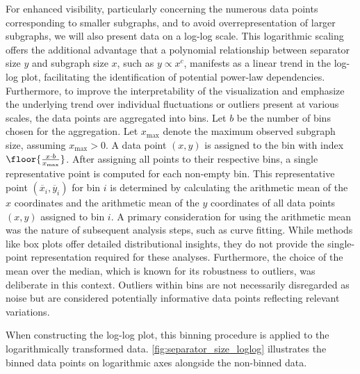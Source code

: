 For enhanced visibility, particularly concerning the numerous data points corresponding to smaller subgraphs, and to avoid overrepresentation of larger subgraphs, we will also present data on a log-log scale.
This logarithmic scaling offers the additional advantage that a polynomial relationship between separator size \( y \) and subgraph size \( x \), such as \( y \propto x^c \), manifests as a linear trend in the log-log plot, facilitating the identification of potential power-law dependencies.
Furthermore, to improve the interpretability of the visualization and emphasize the underlying trend over individual fluctuations or outliers present at various scales, the data points are aggregated into bins.
Let \( b \) be the number of bins chosen for the aggregation.
Let \( x_{\max} \) denote the maximum observed subgraph size, assuming \( x_{\max} > 0 \).
A data point \( (x, y) \) is assigned to the bin with index \( \floor{\frac{x \cdot b}{x_{\max}}} \).
After assigning all points to their respective bins, a single representative point is computed for each non-empty bin.
This representative point \( (\overline{x}_i, \overline{y}_i) \) for bin \( i \) is determined by calculating the arithmetic mean of the \( x \) coordinates and the arithmetic mean of the \( y \) coordinates of all data points \( (x, y) \) assigned to bin \( i \).
A primary consideration for using the arithmetic mean was the nature of subsequent analysis steps, such as curve fitting.
While methods like box plots offer detailed distributional insights, they do not provide the single-point representation required for these analyses.
Furthermore, the choice of the mean over the median, which is known for its robustness to outliers, was deliberate in this context.
Outliers within bins are not necessarily disregarded as noise but are considered potentially informative data points reflecting relevant variations.

When constructing the log-log plot, this binning procedure is applied to the logarithmically transformed data.
\cref{fig:separator_size_loglog} illustrates the binned data points on logarithmic axes alongside the non-binned data.

